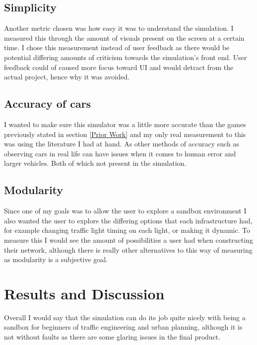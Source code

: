 \documentclass[10pt,twocolumn]{article}
\begin{document}
\subsection{Simplicity}
Another metric chosen was how easy it was to understand the simulation. I measured this through the amount of visuals present on the screen at a certain time. I chose this measurement instead of user feedback as there would be potential differing amounts of criticism towards the simulation's front end. User feedback could of caused more focus toward UI and would detract from the actual project, hence why it was avoided.
\subsection{Accuracy of cars}
I wanted to make sure this simulator was a little more accurate than the games previously stated in section \ref{Prior Work} and my only real measurement to this was using the literature I had at hand. As other methods of accuracy such as observing cars in real life can have issues when it comes to human error and larger vehicles. Both of which not present in the simulation.
\subsection{Modularity}
Since one of my goals was to allow the user to explore a sandbox environment I also wanted the user to explore the differing options that each infrastructure had, for example changing traffic light timing on each light, or making it dynamic. To measure this I would see the amount of possibilities a user had when constructing their network, although there is really other alternatives to this way of measuring as modularity is a subjective goal.
\section{Results and Discussion}
Overall I would say that the simulation can do its job quite nicely with being a sandbox for beginners of traffic engineering and urban planning, although it is not without faults as there are some glaring issues in the final product. 
\end{document}
